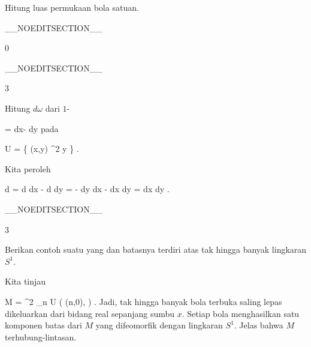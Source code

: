 {

Hitung luas permukaan bola satuan.

}
{  }

__NOEDITSECTION__

{0}

{

}
{  }

__NOEDITSECTION__

{3}

{

Hitung
$d \omega$ dari
$1$-

\mavergleichskettedisp
{\vergleichskette
{ \omega
}
{ =} { {  } dx- {  } dy
}
{ } {
}
{ } {
}
{ } {
}
}
{}{}{}
pada

\mavergleichskette
{\vergleichskette
{ U
}
{ = }{ \left\{ (x,y) \in \R^2  \mid   y          \right\}
}
{  }{
}
{    }{
}
{   }{
}
}
{}{}{.}

}
{

Kita peroleh

\mavergleichskettealign
{\vergleichskettealign
{d \omega
}
{ =} { d {  } \wedge dx - d {  } \wedge dy
}
{ =} { - {  } dy  \wedge dx  -   {  }  dx \wedge dy
}
{ =} { {  }  dx \wedge dy
}
{ } {
}
}
{}
{}{.}

 }

__NOEDITSECTION__

{3}

{

Berikan contoh suatu
yang
dan batasnya terdiri atas
 {} {}
tak hingga banyak lingkaran $S^1$.

}
{

Kita tinjau

\mavergleichskettedisp
{\vergleichskette
{ M
}
{ =} { \R^2 \setminus \biguplus_{n \in \Z} U \left(  (n,0), {  }   \right)
}
{ } {
}
{ } {
}
{ } {
}
}
{}{}{.}
Jadi, tak hingga banyak bola terbuka saling lepas dikeluarkan dari bidang real sepanjang sumbu $x$. Setiap bola menghasilkan satu komponen batas dari $M$ yang difeomorfik dengan lingkaran $S^1$. Jelas bahwa $M$ terhubung-lintasan.

 }

